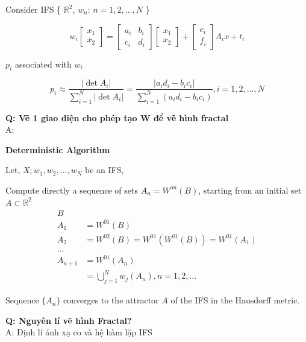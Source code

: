 Consider IFS \{ $\mathbb{R}^2$, $w_n$: $n = 1, 2, \ldots, N$ \}

\begin{equation*}
    w_i 
    \begin{bmatrix}
    x_1\\
    x_2
    \end{bmatrix}
    = 
    \begin{bmatrix}
    a_i & b_i\\
    c_i & d_i
    \end{bmatrix}
    \begin{bmatrix}
    x_1\\
    x_2
    \end{bmatrix}
    +
    \begin{bmatrix}
    e_i\\
    f_i
    \end{bmatrix}
    A_i x + t_i
\end{equation*}

$p_i$ associated with $w_i$

\begin{equation*}
    p_i \approx \frac{|\det A_i|}{\sum_{i=1}^N |\det A_i|} = \frac{|a_i d_i - b_i c_i|}{\sum_{i=1}^N (a_i d_i - b_i c_i)}, i = 1, 2, \ldots, N
\end{equation*}

\textbf{Q: Vẽ 1 giao diện cho phép tạo W để vẽ hình fractal}\\
A:

\textbf{Deterministic Algorithm}

Let, ${X; w_1, w_2, \ldots, w_N}$ be an IFS,

Compute directly a sequence of sets $A_n = W^{on}(B)$, starting from an initial set $A \subset \mathbb{R}^2$
\begin{align*}
    B&\\
    A_1 &= W^{01}(B)\\
    A_2 &= W^{02}(B) = W^{01}(W^{01}(B)) = W^{01}(A_1)\\
    \ldots\\
    A_{n+1} &= W^{01}(A_n)\\
    &= \bigcup_{j=1}^N w_j(A_n), n =1, 2, \ldots
\end{align*}

Sequence $\{A_n\}$ converges to the attractor $A$ of the IFS in the Hausdorff metric.

\textbf{Q: Nguyên lí vẽ hình Fractal?}\\
A: Định lí ánh xạ co và hệ hàm lặp IFS 

